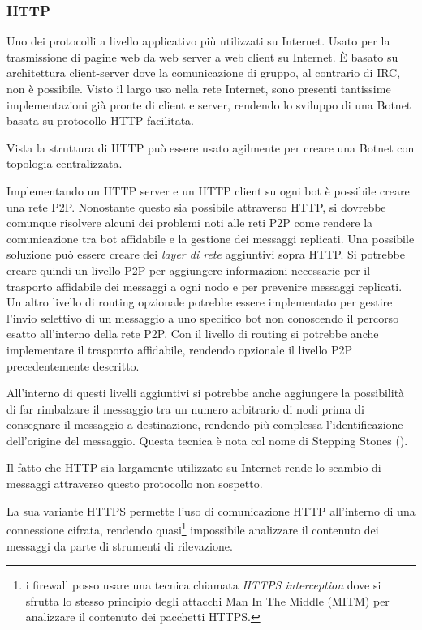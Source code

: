 \subsubsection{HTTP}
\label{HTTP}
Uno dei protocolli a livello applicativo più utilizzati su Internet. Usato per la trasmissione di pagine web da web server a web client su Internet. È basato su architettura client-server dove la comunicazione di gruppo, al contrario di IRC, non è possibile. Visto il largo uso nella rete Internet, sono presenti tantissime implementazioni già pronte di client e server, rendendo lo sviluppo di una Botnet basata su protocollo HTTP facilitata.

Vista la struttura di HTTP può essere usato agilmente per creare una Botnet con topologia centralizzata.

Implementando un HTTP server e un HTTP client su ogni bot è possibile creare una rete P2P.
Nonostante questo sia possibile attraverso HTTP, si dovrebbe comunque risolvere alcuni dei problemi noti alle reti P2P come rendere la comunicazione tra bot affidabile e la gestione dei messaggi replicati.
Una possibile soluzione può essere creare dei \textit{layer di rete}   aggiuntivi sopra HTTP.
Si potrebbe creare quindi un livello P2P per aggiungere informazioni necessarie per il trasporto affidabile dei messaggi a ogni nodo e per prevenire messaggi replicati.
Un altro livello di routing opzionale potrebbe essere implementato per gestire l'invio selettivo di un messaggio a uno specifico bot non conoscendo il percorso esatto all'interno della rete P2P. Con il livello di routing si potrebbe anche implementare il trasporto affidabile, rendendo opzionale il livello P2P precedentemente descritto.


All'interno di questi livelli aggiuntivi si potrebbe anche aggiungere la possibilità di far rimbalzare il messaggio tra un numero arbitrario di nodi prima di consegnare il messaggio a destinazione, rendendo più complessa l'identificazione dell'origine del messaggio. Questa tecnica è nota col nome di Stepping Stones ().

Il fatto che HTTP sia largamente utilizzato su Internet rende lo scambio di messaggi attraverso questo protocollo non sospetto.

La sua variante  HTTPS permette l'uso di comunicazione HTTP all'interno di una connessione cifrata, rendendo quasi\footnote{i firewall posso usare una tecnica chiamata \textit{HTTPS interception} dove si sfrutta lo stesso principio degli attacchi Man In The Middle (MITM)\footnotemark{}  per analizzare il contenuto dei pacchetti HTTPS.} impossibile analizzare il contenuto dei messaggi da parte di strumenti di rilevazione.

